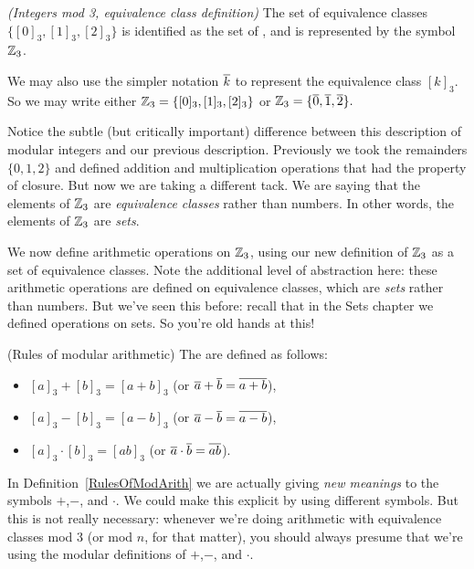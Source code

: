 \begin{defn}\label{mod_eqiv_def_3} \emph{(Integers mod 3, equivalence class definition)}
The set of equivalence classes $\{ [0]_3, [1]_3, [2]_3 \}$ is identified as the set of , and is represented by the symbol~$\mathbb{Z}_3$.

We may also use the simpler notation $\overline{k}$ to represent the equivalence class  $[k]_3$. So we may write either  
$\mathbb{Z}_3 = \{ [0]_3, [1]_3, [2]_3 \}$ or $\mathbb{Z}_3 = \{ \overline{0}, \overline{1}, \overline{2} \} .$
\end{defn}

Notice the subtle (but critically important) difference between this description of modular integers and our previous description. Previously we took the remainders $\{0,1,2\}$ and defined addition and multiplication operations that had the property of closure. But now we are taking a different tack. We are saying that the elements of $\mathbb{Z}_3$ are \emph{equivalence classes} rather than numbers. In other words, the elements of $\mathbb{Z}_3$ are \emph{sets}.

We now define arithmetic operations on $\mathbb{Z}_3$, using our new definition of $\mathbb{Z}_3$ as a set of equivalence classes. Note the additional level of abstraction here: these arithmetic operations are defined on equivalence classes, which are \emph{sets} rather than numbers. But we've seen this before: recall that in the Sets chapter we defined operations on sets. So you're old hands at this!

\begin{defn}\label{RulesOfModArith} (Rules of modular arithmetic)
The  are defined as follows:
\begin{itemize}
\item $[a]_3 + [b]_3 = [a+b]_3$ \qquad (or $\overline{a} + \overline{b} = \overline{a + b}$),
\item $[a]_3 - [b]_3 = [a-b]_3$ \qquad (or $\overline{a} - \overline{b} = \overline{a - b}$),
\item $[a]_3 \cdot [b]_3 = [ab]_3$ \qquad (or $\overline{a} \cdot \overline{b} = \overline{a  b}$).
\end{itemize}
\end{defn}

In Definition~\ref{RulesOfModArith} we are actually giving \emph{new meanings} to the symbols $+$,$-$, and $\cdot$. We could make this explicit by using different symbols. But this is not really necessary: whenever we're doing arithmetic with equivalence classes mod 3 (or mod $n$, for that matter), you should always presume that we're using the modular definitions of $+$,$-$, and $\cdot$.

